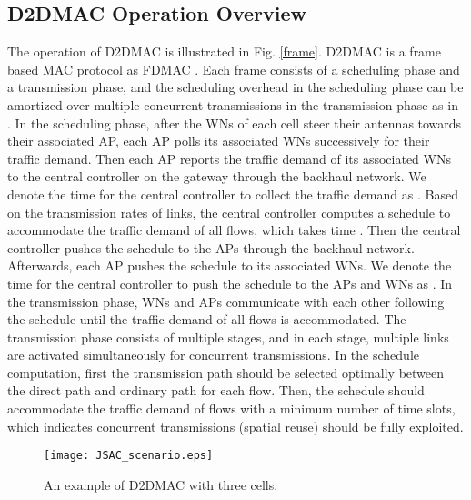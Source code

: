\documentclass[journal]{IEEEtran}
\begin{document}
\subsection{D2DMAC Operation Overview}
The operation of D2DMAC is illustrated in Fig. \ref{frame}. D2DMAC is a frame based MAC protocol as
FDMAC \cite{mao}. Each frame consists of a scheduling phase and a transmission phase, and the scheduling overhead in the scheduling phase can be amortized over multiple concurrent transmissions in the transmission phase as in \cite{mao}. In the
scheduling phase, after the WNs of each cell steer their antennas towards their associated AP, each
AP polls its associated WNs successively for their traffic demand. Then each AP reports the traffic
demand of its associated WNs to the central controller on the gateway through the backhaul network.
We denote the time for the central controller to collect the traffic demand as . Based
on the transmission rates of links, the central controller computes a schedule to accommodate the
traffic demand of all flows, which takes time . Then the central controller pushes the
schedule to the APs through the backhaul network. Afterwards, each AP pushes the schedule to its
associated WNs. We denote the time for the central controller to push the schedule to the APs and
WNs as . In the transmission phase, WNs and APs communicate with each other following
the schedule until the traffic demand of all flows is accommodated. The transmission phase consists
of multiple stages, and in each stage, multiple links are activated simultaneously for concurrent
transmissions. In the schedule computation, first the transmission path should be selected
optimally between the direct path and ordinary path for each flow. Then, the schedule should
accommodate the traffic demand of flows with a minimum number of time slots, which indicates
concurrent transmissions (spatial reuse) should be fully exploited.



\begin{figure} [htbp] \begin{center}
\texttt{[image: JSAC\_scenario.eps]}
\end{center}
\caption{An example of D2DMAC with three cells.} \label{scenario}
\end{figure}
\end{document}
